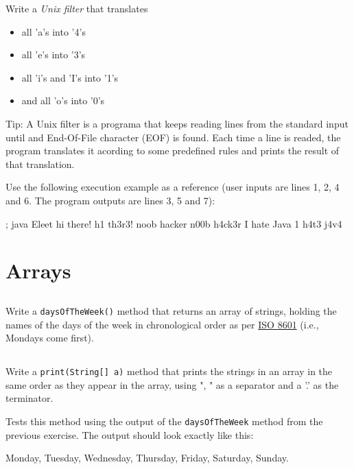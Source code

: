 \documentclass[a4paper, 11pt]{article}
\begin{document}
Write a \textsl{Unix filter} that translates
\begin{itemize}
\item all 'a's into '4's
\item all 'e's into '3's
\item all 'i's and 'I's into '1's
\item and all 'o's into '0's
\end{itemize}

Tip: A Unix filter is a programa that keeps reading lines from the standard
input until and End-Of-File character (EOF) is found. Each time a line is
readed, the program translates it acording to some predefined rules and prints
the result of that translation.

Use the following execution example as a reference (user inputs are lines 1, 2,
4 and 6. The program outputs are lines 3, 5 and 7):

\begin{blackboard}
; java Eleet
hi there!
h1 th3r3!
noob hacker
n00b h4ck3r
I hate Java
1 h4t3 j4v4
\end{blackboard}


\section{Arrays}

\subsection{}

Write a \texttt{daysOfTheWeek()} method that returns an array of strings,
holding the names of the days of the week in chronological order as per
\href{http://en.wikipedia.org/wiki/ISO_8601}{ISO 8601} (i.e., Mondays come
  first).

\subsection{}

Write a \texttt{print(String[] a)} method that prints the strings in an array
in the same order as they appear in the array, using ", " as a separator and a
'.' as the terminator.

Tests this method using the output of the \texttt{daysOfTheWeek} method from
the previous exercise. The output should look exactly like this:

\begin{blackboard}
Monday, Tuesday, Wednesday, Thursday, Friday, Saturday, Sunday.
\end{blackboard}
\end{document}
